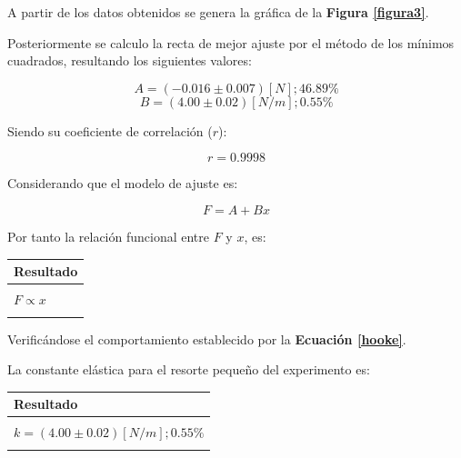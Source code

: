 \documentclass[letter,11pt]{article}
\begin{document}
A partir de los datos obtenidos se genera la gráfica de la
\textbf{Figura \ref{figura3}}.

Posteriormente se calculo la recta de mejor ajuste por el método de los mínimos
cuadrados, resultando los siguientes valores:

\begin{equation*}
    A = (-0.016 \pm 0.007) [N]; 46.89\%
\end{equation*}
\begin{equation*}
    B = (4.00 \pm 0.02) [N/m]; 0.55\%
\end{equation*}
\vspace{0.10cm}

Siendo su coeficiente de correlación ($r$):

\begin{equation*}
    r = 0.9998
\end{equation*}
\vspace{0.10cm}

Considerando que el modelo de ajuste es:

\begin{equation*}
    F = A + B x
\end{equation*}
\vspace{0.10cm}

Por tanto la relación funcional entre $F$ y $x$, es:

\begin{center}
\begin{tabular}{|>{\centering}m{9.2cm}<{\centering}|}
\hline
\textbf{Resultado} 
\tabularnewline \hline
\\
$F \propto x$ \tabularnewline
\\
\hline
\end{tabular}
\end{center}
\vspace{0.10cm}

Verificándose el comportamiento establecido por la
\textbf{Ecuación \ref{hooke}}.

La constante elástica para el resorte pequeño del experimento es:

\begin{center}
\begin{tabular}{|>{\centering}m{9.2cm}<{\centering}|}
\hline
\textbf{Resultado} 
\tabularnewline \hline
\\
$k = (4.00 \pm 0.02) [N/m]; 0.55\%$ \tabularnewline
\\
\hline
\end{tabular}
\end{center}
\vspace{0.10cm}
\end{document}
